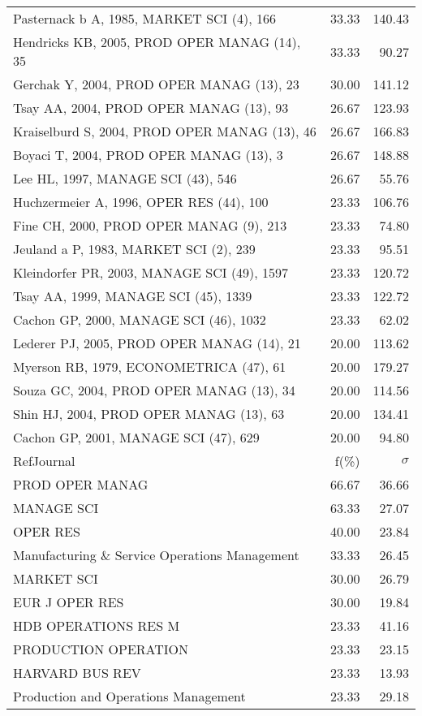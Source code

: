 \documentclass[a4paper,11pt]{report}
\begin{document}
\begin{landscape}
\begin{table}[!ht]
{\begin{tabular}{|l r r|}
Pasternack b A, 1985, MARKET SCI (4), 166 & 33.33 & 140.43\\
Hendricks KB, 2005, PROD OPER MANAG (14), 35 & 33.33 & 90.27\\
Gerchak Y, 2004, PROD OPER MANAG (13), 23 & 30.00 & 141.12\\
Tsay AA, 2004, PROD OPER MANAG (13), 93 & 26.67 & 123.93\\
Kraiselburd S, 2004, PROD OPER MANAG (13), 46 & 26.67 & 166.83\\
Boyaci T, 2004, PROD OPER MANAG (13), 3 & 26.67 & 148.88\\
Lee HL, 1997, MANAGE SCI (43), 546 & 26.67 & 55.76\\
Huchzermeier A, 1996, OPER RES (44), 100 & 23.33 & 106.76\\
Fine CH, 2000, PROD OPER MANAG (9), 213 & 23.33 & 74.80\\
Jeuland a P, 1983, MARKET SCI (2), 239 & 23.33 & 95.51\\
Kleindorfer PR, 2003, MANAGE SCI (49), 1597 & 23.33 & 120.72\\
Tsay AA, 1999, MANAGE SCI (45), 1339 & 23.33 & 122.72\\
Cachon GP, 2000, MANAGE SCI (46), 1032 & 23.33 & 62.02\\
Lederer PJ, 2005, PROD OPER MANAG (14), 21 & 20.00 & 113.62\\
Myerson RB, 1979, ECONOMETRICA (47), 61 & 20.00 & 179.27\\
Souza GC, 2004, PROD OPER MANAG (13), 34 & 20.00 & 114.56\\
Shin HJ, 2004, PROD OPER MANAG (13), 63 & 20.00 & 134.41\\
Cachon GP, 2001, MANAGE SCI (47), 629 & 20.00 & 94.80\\
\hline
\hline
RefJournal & f(\%) & $\sigma$\\
\hline
PROD OPER MANAG & 66.67 & 36.66\\
MANAGE SCI & 63.33 & 27.07\\
OPER RES & 40.00 & 23.84\\
Manufacturing \& Service Operations Management & 33.33 & 26.45\\
MARKET SCI & 30.00 & 26.79\\
EUR J OPER RES & 30.00 & 19.84\\
HDB OPERATIONS RES M & 23.33 & 41.16\\
PRODUCTION OPERATION & 23.33 & 23.15\\
HARVARD BUS REV & 23.33 & 13.93\\
Production and Operations Management & 23.33 & 29.18\\
\hline
\end{tabular}
}
\end{table}

\end{landscape}
\end{document}
